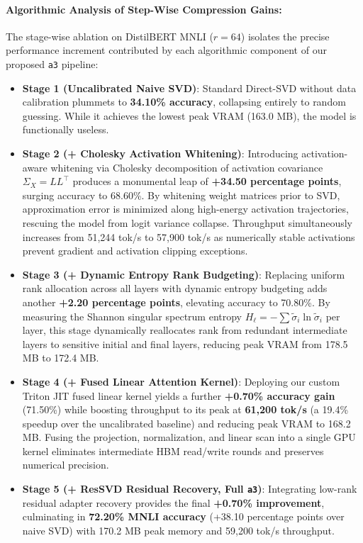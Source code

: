 \documentclass{article}
\begin{document}


\paragraph{Algorithmic Analysis of Step-Wise Compression Gains:}
The stage-wise ablation on DistilBERT MNLI ($r=64$) isolates the precise performance increment contributed by each algorithmic component of our proposed \texttt{a3} pipeline:
\begin{itemize}
    \item \textbf{Stage 1 (Uncalibrated Naive SVD)}: Standard Direct-SVD without data calibration plummets to \textbf{34.10\% accuracy}, collapsing entirely to random guessing. While it achieves the lowest peak VRAM (163.0 MB), the model is functionally useless.
    \item \textbf{Stage 2 (+ Cholesky Activation Whitening)}: Introducing activation-aware whitening via Cholesky decomposition of activation covariance $\Sigma_X = L L^\top$ produces a monumental leap of \textbf{+34.50 percentage points}, surging accuracy to 68.60\%. By whitening weight matrices prior to SVD, approximation error is minimized along high-energy activation trajectories, rescuing the model from logit variance collapse. Throughput simultaneously increases from 51,244 tok/s to 57,900 tok/s as numerically stable activations prevent gradient and activation clipping exceptions.
    \item \textbf{Stage 3 (+ Dynamic Entropy Rank Budgeting)}: Replacing uniform rank allocation across all layers with dynamic entropy budgeting adds another \textbf{+2.20 percentage points}, elevating accuracy to 70.80\%. By measuring the Shannon singular spectrum entropy $H_\ell = -\sum \tilde{\sigma}_i \ln \tilde{\sigma}_i$ per layer, this stage dynamically reallocates rank from redundant intermediate layers to sensitive initial and final layers, reducing peak VRAM from 178.5 MB to 172.4 MB.
    \item \textbf{Stage 4 (+ Fused Linear Attention Kernel)}: Deploying our custom Triton JIT fused linear kernel yields a further \textbf{+0.70\% accuracy gain} (71.50\%) while boosting throughput to its peak at \textbf{61,200 tok/s} (a 19.4\% speedup over the uncalibrated baseline) and reducing peak VRAM to 168.2 MB. Fusing the projection, normalization, and linear scan into a single GPU kernel eliminates intermediate HBM read/write rounds and preserves numerical precision.
    \item \textbf{Stage 5 (+ ResSVD Residual Recovery, Full \texttt{a3})}: Integrating low-rank residual adapter recovery provides the final \textbf{+0.70\% improvement}, culminating in \textbf{72.20\% MNLI accuracy} (+38.10 percentage points over naive SVD) with 170.2 MB peak memory and 59,200 tok/s throughput.
\end{itemize}
\end{document}
